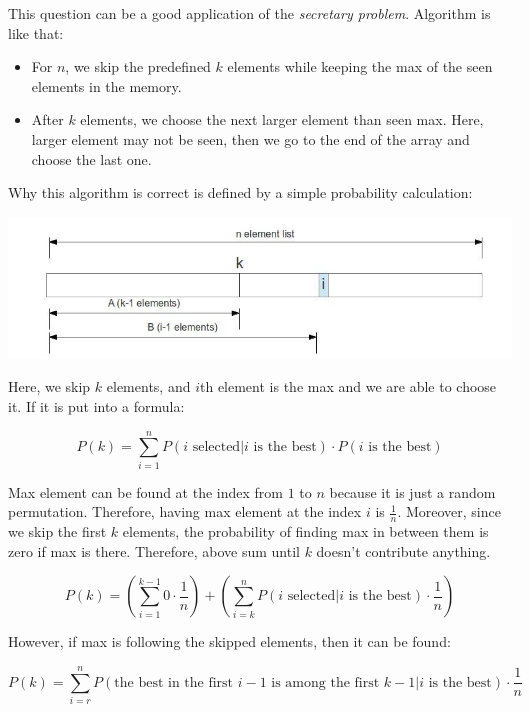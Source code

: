 This question can be a good application of the \textit{secretary problem}. Algorithm is like that:

\begin{itemize}
  \item For $n$, we skip the predefined $k$ elements while keeping the max of the seen elements in the memory.
  \item After $k$ elements, we choose the next larger element than seen max. Here, larger element may not be seen, then we go to the end of the array and choose the last one.
\end{itemize}

Why this algorithm is correct is defined by a simple probability calculation:

\includegraphics[scale=0.5]{q4}

  Here, we skip $k$ elements, and $i$th element is the max and we are able to choose it. If it is put into a formula:

\begin{equation*}
  P(k) = \sum_{i=1}^{n} P(\text{$i$ selected} | \text{$i$ is the best}) \cdot P(\text{$i$ is the best})
\end{equation*}

  Max element can be found at the index from $1$ to $n$ because it is just a random permutation. Therefore, having max element at the index $i$ is $\frac{1}{n}$. Moreover, since we skip the first $k$ elements, the probability of finding max in between them is zero if max is there. Therefore, above sum until $k$ doesn't contribute anything.

\begin{equation*}
  P(k) = \left( \sum_{i=1}^{k-1} 0 \cdot \frac{1}{n} \right) + \left(\sum_{i=k}^{n} P(\text{$i$ selected} | \text{$i$ is the best}) \cdot \frac{1}{n} \right)
\end{equation*}

  However, if max is following the skipped elements, then it can be found:
  
\begin{equation*}
  P(k) = \sum_{i=r}^{n} P(
         \text{the best in the first $i-1$ is among the first $k-1$} | \text{$i$ is the best}) \cdot \frac{1}{n}
\end{equation*}

